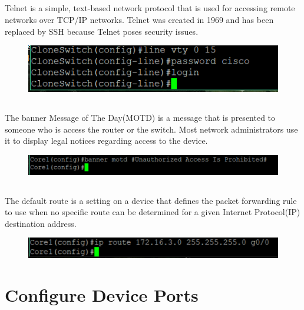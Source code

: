\documentclass{article}
\begin{document}
\subsection{}
	Telnet is a simple, text-based network protocol that is used for accessing remote networks over TCP/IP networks. Telnet was created in 1969 and has been replaced by SSH because Telnet poses security issues.
\begin{figure}[h]
		\includegraphics[width=1\linewidth]{"telnet access"}
		\caption{}
\end{figure}
\subsection{}
	The banner Message of The Day(MOTD) is a message that is presented to someone who is access the router or the switch. Most network administrators use it to display legal notices regarding access to the device.
\begin{figure}[h]
	\includegraphics[width=1\linewidth]{motd}
	\caption{}
\end{figure}
\subsection{}
The default route is a setting on a device that defines the packet forwarding rule to use when no specific route can be determined for a given Internet Protocol(IP) destination address.
\begin{figure}[h]
	\includegraphics[width=1\linewidth]{"default route"}
	\caption{}
\end{figure}
\newpage
\section{Configure Device Ports}
\end{document}
